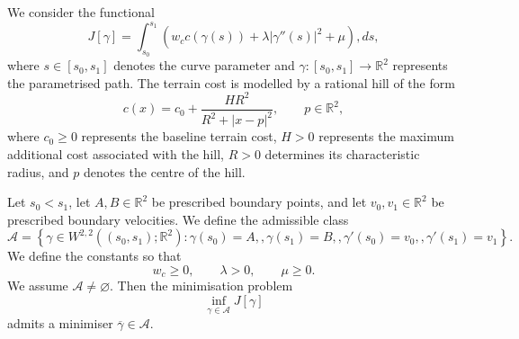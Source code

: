 \begin{theorem}
We consider the functional
\begin{equation}
\label{eq:rational_functional}
J[\gamma]
=
\int_{s_0}^{s_1}
\left(
w_c c(\gamma(s))
+
\lambda|\gamma''(s)|^2
+
\mu
\right),ds,
\end{equation}
where $s\in[s_0,s_1]$ denotes the curve parameter and
$\gamma:[s_0,s_1]\to\mathbb{R}^2$ represents the parametrised path. The terrain cost is modelled by a rational hill of the form
\begin{equation}
\label{eq:rational_hill}
c(x)
=c_0+
\frac{HR^2}{R^2+|x-p|^2},
\qquad p\in\mathbb{R}^2,
\end{equation}
where $c_0\geq0$ represents the baseline terrain cost, $H>0$ represents the maximum additional cost associated with the hill, $R>0$ determines its characteristic radius, and $p$ denotes the centre of the hill.

Let $s_0<s_1$, let $A,B\in\mathbb{R}^2$ be prescribed boundary points, and let $v_0,v_1\in\mathbb{R}^2$ be prescribed boundary velocities. We define the admissible class
\begin{equation}
\label{eq:admissible_rational}
\mathcal{A}
=
\left\{
\gamma\in W^{2,2}((s_0,s_1);\mathbb{R}^2):
\gamma(s_0)=A,,
\gamma(s_1)=B,,
\gamma'(s_0)=v_0,,
\gamma'(s_1)=v_1
\right\}.
\end{equation}
We define the constants so that
$$
w_c\geq0,\qquad
\lambda>0,\qquad
\mu\geq0.
$$
We assume $\mathcal{A}\neq\varnothing$. Then the minimisation problem
\begin{equation}
\label{eq:rational_minimisation}
\inf_{\gamma\in\mathcal{A}}J[\gamma]
\end{equation}
admits a minimiser $\overline{\gamma}\in\mathcal{A}$.
\end{theorem}

